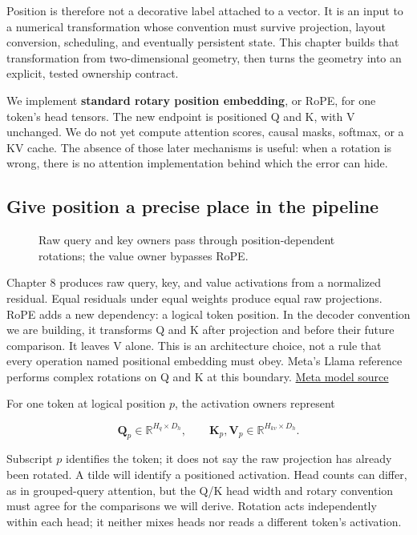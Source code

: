 \documentclass[
  10pt,
]{article}
\begin{document}
Position is therefore not a decorative label attached to a vector. It is
an input to a numerical transformation whose convention must survive
projection, layout conversion, scheduling, and eventually persistent
state. This chapter builds that transformation from two-dimensional
geometry, then turns the geometry into an explicit, tested ownership
contract.

We implement \textbf{standard rotary position embedding}, or RoPE, for
one token's head tensors. The new endpoint is positioned Q and K, with V
unchanged. We do not yet compute attention scores, causal masks,
softmax, or a KV cache. The absence of those later mechanisms is useful:
when a rotation is wrong, there is no attention implementation behind
which the error can hide.

\subsection{Give position a precise place in the
pipeline}\label{give-position-a-precise-place-in-the-pipeline}

\begin{figure}[H]\centering\resizebox{\linewidth}{!}{}\caption{Raw query and key owners pass through position-dependent rotations; the value owner bypasses RoPE.}\end{figure}

Chapter 8 produces raw query, key, and value activations from a
normalized residual. Equal residuals under equal weights produce equal
raw projections. RoPE adds a new dependency: a logical token position.
In the decoder convention we are building, it transforms Q and K after
projection and before their future comparison. It leaves V alone. This
is an architecture choice, not a rule that every operation named
positional embedding must obey. Meta's Llama reference performs complex
rotations on Q and K at this boundary.
\href{https://raw.githubusercontent.com/meta-llama/llama-models/main/models/llama3/model.py}{Meta
model source}

For one token at logical position \(p\), the activation owners represent

\[
\mathbf{Q}_p\in\mathbb{R}^{H_q\times D_h},\qquad
\mathbf{K}_p,\mathbf{V}_p\in\mathbb{R}^{H_{kv}\times D_h}.
\]

Subscript \(p\) identifies the token; it does not say the raw projection
has already been rotated. A tilde will identify a positioned activation.
Head counts can differ, as in grouped-query attention, but the Q/K head
width and rotary convention must agree for the comparisons we will
derive. Rotation acts independently within each head; it neither mixes
heads nor reads a different token's activation.
\end{document}
